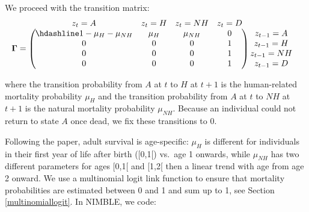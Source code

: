 \documentclass[
  12pt,
]{krantz}
\begin{document}
We proceed with the transition matrix:
\[\begin{matrix}
& \\
\mathbf{\Gamma} =
\left ( \vphantom{ \begin{matrix} 12 \\ 12 \\ 12 \\ 12 \end{matrix} } \right .
\end{matrix}
\hspace{-1.2em}
\begin{matrix}
z_t=A & z_t=H & z_t=NH & z_t=D \\ \hdashline
1 - \mu_H - \mu_{NH}  & \mu_H & \mu_{NH} & 0\\
0 & 0 & 0 &  1\\
0 & 0 & 0 &  1\\
0 & 0 & 0 &  1
\end{matrix}
\hspace{-0.2em}
\begin{matrix}
& \\
\left . \vphantom{ \begin{matrix} 12 \\ 12 \\ 12 \\ 12 \end{matrix} } \right )
\begin{matrix}
z_{t-1}=A \\ z_{t-1}=H \\ z_{t-1}=NH \\ z_{t-1}=D
\end{matrix}
\end{matrix}\]

where the transition probability from \(A\) at \(t\) to \(H\) at \(t + 1\) is the human-related mortality probability \(\mu_H\) and the transition probability from \(A\) at \(t\) to \(NH\) at \(t + 1\) is the natural mortality probability \(\mu_{NH}\). Because an individual could not return to state \(A\) once dead, we fix these transitions to 0.

Following the paper, adult survival is age-specific: \(\mu_H\) is different for individuals in their first year of life after birth ({[}0,1{[}) vs.~age 1 onwards, while \(\mu_{NH}\) has two different parameters for ages {[}0,1{[} and {[}1,2{[} then a linear trend with age from age 2 onward. We use a multinomial logit link function to ensure that mortality probabilities are estimated between 0 and 1 and sum up to 1, see Section \ref{multinomiallogit}. In NIMBLE, we code:
\end{document}
